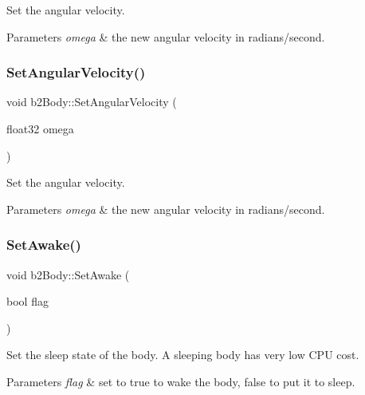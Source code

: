 Set the angular velocity. 
\begin{DoxyParams}{Parameters}
{\em omega} & the new angular velocity in radians/second. \\
\hline
\end{DoxyParams}
\mbox{\label{classb2Body_a37adc4160b84f73e8552a91cbde3f578}} 
\subsubsection{\texorpdfstring{Set\+Angular\+Velocity()}{SetAngularVelocity()}\hspace{0.1cm}{\footnotesize\ttfamily [2/2]}}
{\footnotesize\ttfamily void b2\+Body\+::\+Set\+Angular\+Velocity (\begin{DoxyParamCaption}\item[{float32}]{omega }\end{DoxyParamCaption})}

Set the angular velocity. 
\begin{DoxyParams}{Parameters}
{\em omega} & the new angular velocity in radians/second. \\
\hline
\end{DoxyParams}
\mbox{\label{classb2Body_ac72ed3df52a26c33db82252ab57399af}} 
\subsubsection{\texorpdfstring{Set\+Awake()}{SetAwake()}\hspace{0.1cm}{\footnotesize\ttfamily [1/2]}}
{\footnotesize\ttfamily void b2\+Body\+::\+Set\+Awake (\begin{DoxyParamCaption}\item[{bool}]{flag }\end{DoxyParamCaption})\hspace{0.3cm}{\ttfamily [inline]}}

Set the sleep state of the body. A sleeping body has very low C\+PU cost. 
\begin{DoxyParams}{Parameters}
{\em flag} & set to true to wake the body, false to put it to sleep. \\
\hline
\end{DoxyParams}
\mbox{\label{classb2Body_ac72ed3df52a26c33db82252ab57399af}} 
